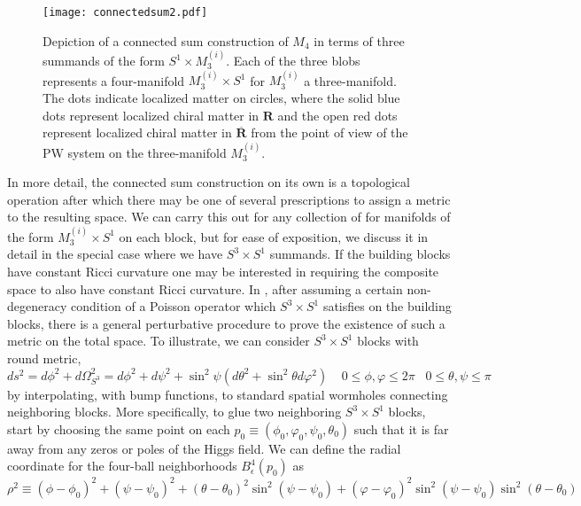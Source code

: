\documentclass[12pt]{article}%
\numberwithin{equation}{section}
\renewcommand{\(}{\left(}
\renewcommand{\)}{\right)}
\renewcommand{\[}{\left[}
\renewcommand{\]}{\right]}
\begin{document}
\begin{figure}[t!]
\centering
\texttt{[image: connectedsum2.pdf]}
\caption{Depiction of a connected sum construction of $M_4$ in terms of three summands of the form $S^1 \times M^{(i)}_3$. Each of the three blobs represents a four-manifold $M^{(i)}_3\times S^1$ for $M^{(i)}_{3}$ a three-manifold. The dots indicate localized matter on circles, where the solid blue dots represent localized chiral matter in $\mathbf{R}$ and the open red dots represent localized chiral matter in $\overline{\mathbf{R}}$ from the point of view of the PW system on the three-manifold $M^{(i)}_3$.}
\label{fig:connsum}
\end{figure}

In more detail, the connected sum construction on its own is a topological operation after which there may be one of several prescriptions to assign a metric to the resulting space. We can carry this out for any collection of for manifolds of the form $M_{3}^{(i)} \times S^1$ on each
block, but for ease of exposition, we discuss it in detail in the special case where we have $S^3 \times S^1$ summands.
If the building blocks have constant Ricci curvature one may be interested in requiring the composite space to also have constant Ricci curvature. In \cite{tmna/1479265331}, after assuming a certain non-degeneracy condition of a Poisson operator which $S^3\times S^1$ satisfies on the building blocks, there is a general perturbative procedure to prove the existence of such a metric on the total space. To illustrate, we can consider $S^3\times S^1$ blocks with round metric,
\begin{equation}
ds^2=d\phi^2+d\Omega^2_{S^3}=d\phi^2+d\psi^2+\sin^2\psi(d\theta^2+\sin^2\theta d\varphi^2) \; \; \; \; 0\leq \phi,\varphi\leq 2\pi \; \; \; 0\leq \theta,\psi \leq \pi
\end{equation}
by interpolating, with bump functions, to standard spatial wormholes connecting neighboring blocks. More specifically, to glue two neighboring $S^3\times S^1$ blocks, start by choosing the same point on each $p_0 \equiv (\phi_0,\varphi_0,\psi_0,\theta_0)$ such that it is far away from any zeros or poles of the Higgs field. We can define the radial coordinate for the four-ball neighborhoods $B^4_\epsilon(p_0)$ as
\begin{equation}
\rho^2 \equiv (\phi-\phi_0)^2+(\psi-\psi_0)^2+(\theta-\theta_0)^2 \sin^2(\psi-\psi_0) + (\varphi-\varphi_0)^2 \sin^2(\psi-\psi_0)\sin^2(\theta-\theta_0)
\end{equation}
\end{document}

